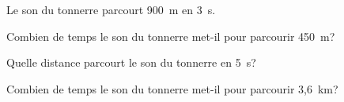 Le son du tonnerre parcourt 900~m en 3~s.
\begin{myenumerate}
	\item Combien de temps le son du tonnerre met-il pour parcourir 450~m? 
	\item Quelle distance parcourt le son du tonnerre en 5~s?
	\item Combien de temps le son du tonnerre met-il pour parcourir 3,6~km?
\end{myenumerate}